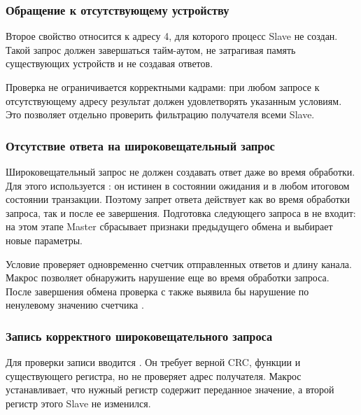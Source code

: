 \subsubsection{Обращение к отсутствующему устройству}

Второе свойство относится к адресу 4, для которого процесс Slave не создан.
Такой запрос должен завершаться тайм-аутом, не затрагивая память
существующих устройств и не создавая ответов.


Проверка не ограничивается корректными кадрами: при любом запросе
к отсутствующему адресу результат должен удовлетворять указанным условиям.
Это позволяет отдельно проверить фильтрацию получателя всеми Slave.

\subsubsection{Отсутствие ответа на широковещательный запрос}

Широковещательный запрос не должен создавать ответ даже во время
обработки. Для этого используется : он истинен
в состоянии ожидания и в любом итоговом состоянии транзакции.
Поэтому запрет ответа действует как во время обработки запроса,
так и после ее завершения. Подготовка следующего запроса в 
не входит: на этом этапе Master сбрасывает признаки предыдущего обмена
и выбирает новые параметры.


Условие проверяет одновременно счетчик отправленных ответов и длину
канала. Макрос  позволяет обнаружить нарушение еще во время
обработки запроса. После завершения обмена проверка с 
также выявила бы нарушение по ненулевому значению счетчика
.

\subsubsection{Запись корректного широковещательного запроса}

Для проверки записи вводится . Он требует верной CRC,
функции  и существующего регистра, но не проверяет адрес
получателя. Макрос  устанавливает, что нужный регистр
содержит переданное значение, а второй регистр этого Slave не изменился.

